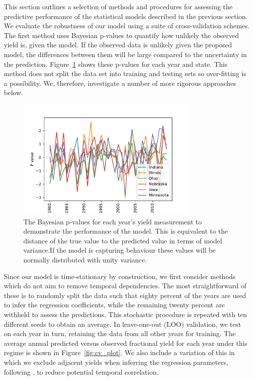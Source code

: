\documentclass[12pt]{article}
\begin{document}
This section outlines a selection of methods and procedures for assessing the predictive performance of the statistical models described in the previous section. We evaluate the robustness of our model using a suite of cross-validation schemes. The first method uses Bayesian p-values to quantify how unlikely the observed yield is, given the model. If the observed data is unlikely given the proposed model, the differences between them will be large compared to the uncertainty in the prediction. Figure~\ref{fig:pvalues_all} shows these p-values for each year and state. This method does not split the data set into training and testing sets so over-fitting is a possibility. We, therefore, investigate a number of more rigorous approaches below.

\begin{figure}
\centering
\includegraphics[width=0.8\textwidth]{./figures/pvalues_all}
\caption{\label{fig:pvalues_all} The Bayesian p-values for each year's yield measurement to demonstrate the performance of the model. This is equivalent to the distance of the true value to the predicted value in terms of model variance.If the model is capturing behaviour these values will be normally distributed with unity variance.}
\end{figure}


Since our model is time-stationary by construction, we first consider methods which do not aim to remove temporal dependencies. The most straightforward of these is to randomly split the data such that eighty percent of the years are used to infer the regression coefficients, while the remaining twenty percent are withheld to assess the predictions. This stochastic procedure is repeated with ten different seeds to obtain an average. In leave-one-out (LOO) validation, we test on each year in turn, retaining the data from all other years for training. The average annual predicted versus observed fractional yield for each year under this regime is shown in Figure~\ref{fig:cv_plot}. We also include a variation of this in which we exclude adjacent yields when inferring the regression parameters, following \citep{iizumi:2018}, to reduce potential temporal correlation.
\end{document}
